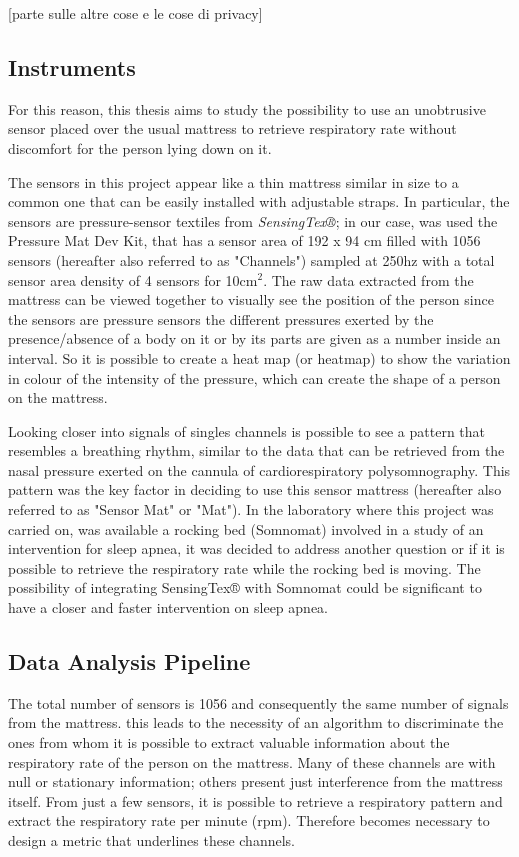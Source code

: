 \documentclass[a4paper,11pt, oneside,italian]{article}
\begin{document}
[parte sulle altre cose e le cose di privacy]


\subsection*{Instruments}
For this reason, this thesis aims to study the possibility to use an unobtrusive sensor placed over the usual mattress to retrieve 
respiratory rate without discomfort for the person lying down on it. 


The sensors in this project appear like a thin mattress similar in size to a common one that can be easily installed with adjustable straps.
In particular, the sensors are pressure-sensor textiles from \textit{SensingTex®}; in our case, was used the Pressure Mat Dev Kit,
 that has a sensor area of 192 x 94 cm filled with 1056 sensors (hereafter also referred to as "Channels") sampled at 250hz
 with a total sensor area density of 4 sensors for 10cm$^2$.
 The raw data extracted from the mattress can be viewed together to visually see the position of the person since the sensors are pressure sensors
the different pressures exerted by the presence/absence of a body on it or by its parts are given as a number inside an interval. 
So it is possible to create a heat map (or heatmap) to show the variation in colour of the intensity of the pressure, which can create the shape of
a person on the mattress.

Looking closer into signals of singles channels is possible to see a pattern that resembles a breathing rhythm,  similar to the data that can
 be retrieved from the nasal pressure exerted on the cannula of cardiorespiratory polysomnography.
This pattern was the key factor in deciding to use this sensor mattress (hereafter also referred to as "Sensor Mat" or "Mat"). 
In the laboratory where this project was carried on, was available a rocking bed (Somnomat) involved in a study of an intervention for 
sleep apnea, it was decided to address another question or if it is possible to retrieve the respiratory rate while the rocking bed is moving.
The possibility of integrating SensingTex® with Somnomat could be significant to have a closer and faster intervention on sleep apnea.

\subsection*{Data Analysis Pipeline}

The total number of sensors is 1056 and consequently the same number of signals from the mattress.
this leads to the necessity of an algorithm to discriminate the ones from whom 
it is possible to extract valuable information about the respiratory rate of the person on the mattress.
Many of these channels are with null or stationary information; others present just interference from the 
mattress itself. From just a few sensors, it is possible to retrieve a respiratory pattern and extract the 
respiratory rate per minute (rpm). Therefore becomes necessary to design a metric that underlines these channels.
\end{document}
